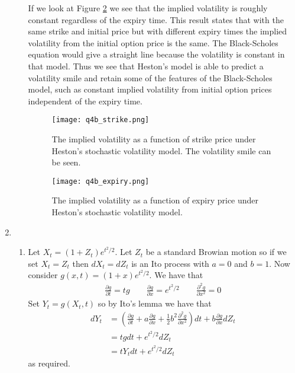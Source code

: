 \documentclass[10pt,english]{article}
\theoremstyle{plain}
\begin{document}
\begin{enumerate}
\begin{enumerate}
If we look at Figure \ref{hesexpiry} we see that the implied volatility is roughly constant regardless of the expiry time.  This result states that with the same strike and initial price but with different expiry times the implied volatility from the initial option price is the same. The Black-Scholes equation would give a straight line because the volatility is constant in that model. Thus we see that Heston's model is able to predict a volatility smile and retain some of the features of the Black-Scholes model, such as constant implied volatility from initial option prices independent of the expiry time.
\begin{figure}
\begin{center}
\texttt{[image: q4b\_strike.png]}
\caption{The implied volatility as a function of strike price under Heston's stochastic volatility model. The volatility smile can be seen.}
\label{hesstrike}
\end{center}
\end{figure}
\begin{figure}
\begin{center}
\texttt{[image: q4b\_expiry.png]}
\caption{The implied volatility as a function of expiry price under Heston's stochastic volatility model.}
\label{hesexpiry}
\end{center}
\end{figure}
\end{enumerate}
\item
\begin{enumerate}
\item Let $X_{t}=(1+Z_{t})e^{t^{2}/2}$. Let $Z_{t}$ be a standard Browian motion so if we set $X_{t}=Z_{t}$ then $dX_{t} = dZ_{t}$ is an Ito process with $a=0$ and $b=1$. Now consider $g(x,t)=(1+x)e^{t^{2}/2}$. We have that
\begin{align*}
\frac{\partial g}{\partial t} = tg \qquad \frac{\partial g}{\partial x}= e^{t^{2}/2} \qquad \frac{\partial^{2}g}{\partial x^{2}} = 0
\end{align*}
Set $Y_{t}=g(X_{t},t)$ so by Ito's lemma we have that
\begin{align*}
dY_{t} &= \left(\frac{\partial g}{\partial t} + a\frac{\partial g}{\partial x} + \frac{1}{2}b^{2}\frac{\partial^{2}g}{\partial x^{2}}\right)dt+b\frac{\partial g}{\partial x}dZ_{t}\\
&= tg dt + e^{t^{2}/2}dZ_{t}\\
&= tY_{t} dt + e^{t^{2}/2}dZ_{t}
\end{align*}
as required.


\end{enumerate}
\end{enumerate}
\end{document}
